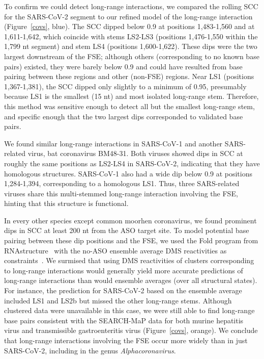 \documentclass[main.tex]{subfiles}
\begin{document}
To confirm we could detect long-range interactions, we compared the rolling SCC for the SARS-CoV-2 segment to our refined model of the long-range interaction (Figure~\ref{covs}, blue).
The SCC dipped below 0.9 at positions 1,483-1,560 and at 1,611-1,642, which coincide with stems LS2-LS3 (positions 1,476-1,550 within the 1,799 nt segment) and stem LS4 (positions 1,600-1,622).
These dips were the two largest downstream of the FSE; although others (corresponding to no known base pairs) existed, they were barely below 0.9 and could have resulted from base pairing between these regions and other (non-FSE) regions.
Near LS1 (positions 1,367-1,381), the SCC dipped only slightly to a minimum of 0.95, presumably because LS1 is the smallest (15 nt) and most isolated long-range stem.
Therefore, this method was sensitive enough to detect all but the smallest long-range stem, and specific enough that the two largest dips corresponded to validated base pairs.

We found similar long-range interactions in SARS-CoV-1 and another SARS-related virus, bat coronavirus BM48-31.
Both viruses showed dips in SCC at roughly the same positions as LS2-LS4 in SARS-CoV-2, indicating that they have homologous structures.
SARS-CoV-1 also had a wide dip below 0.9 at positions 1,284-1,394, corresponding to a homologous LS1.
Thus, three SARS-related viruses share this multi-stemmed long-range interaction involving the FSE, hinting that this structure is functional.

In every other species except common moorhen coronavirus, we found prominent dips in SCC at least 200 nt from the ASO target site.
To model potential base pairing between these dip positions and the FSE, we used the Fold program from RNAstructure~\cite{Mathews2004a} with the no-ASO ensemble average DMS reactivities as constraints~\cite{Cordero2012}.
We surmised that using DMS reactivities of clusters corresponding to long-range interactions would generally yield more accurate predictions of long-range interactions than would ensemble averages (over all structural states).
For instance, the prediction for SARS-CoV-2 based on the ensemble average included LS1 and LS2b but missed the other long-range stems.
Although clustered data were unavailable in this case, we were still able to find long-range base pairs consistent with the SEARCH-MaP data for both murine hepatitis virus and transmissible gastroenteritis virus (Figure~\ref{covs}, orange).
We conclude that long-range interactions involving the FSE occur more widely than in just SARS-CoV-2, including in the genus \textit{Alphacoronavirus}.
\end{document}
